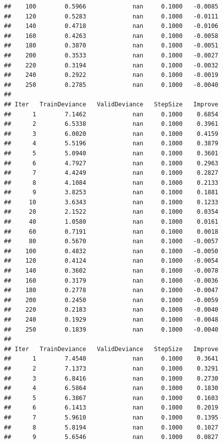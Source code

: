 \documentclass[
]{book}
\begin{document}
\begin{verbatim}
##    100        0.5966             nan     0.1000   -0.0085
##    120        0.5283             nan     0.1000   -0.0111
##    140        0.4718             nan     0.1000   -0.0106
##    160        0.4263             nan     0.1000   -0.0058
##    180        0.3870             nan     0.1000   -0.0051
##    200        0.3533             nan     0.1000   -0.0027
##    220        0.3194             nan     0.1000   -0.0032
##    240        0.2922             nan     0.1000   -0.0019
##    250        0.2785             nan     0.1000   -0.0040
## 
## Iter   TrainDeviance   ValidDeviance   StepSize   Improve
##      1        7.1462             nan     0.1000    0.6854
##      2        6.5338             nan     0.1000    0.3961
##      3        6.0020             nan     0.1000    0.4159
##      4        5.5196             nan     0.1000    0.3879
##      5        5.0940             nan     0.1000    0.3601
##      6        4.7927             nan     0.1000    0.2963
##      7        4.4249             nan     0.1000    0.2827
##      8        4.1084             nan     0.1000    0.2133
##      9        3.8253             nan     0.1000    0.1881
##     10        3.6343             nan     0.1000    0.1233
##     20        2.1522             nan     0.1000    0.0354
##     40        1.0580             nan     0.1000    0.0161
##     60        0.7191             nan     0.1000    0.0018
##     80        0.5670             nan     0.1000   -0.0057
##    100        0.4832             nan     0.1000   -0.0050
##    120        0.4124             nan     0.1000   -0.0054
##    140        0.3602             nan     0.1000   -0.0078
##    160        0.3179             nan     0.1000   -0.0036
##    180        0.2778             nan     0.1000   -0.0047
##    200        0.2450             nan     0.1000   -0.0059
##    220        0.2183             nan     0.1000   -0.0040
##    240        0.1929             nan     0.1000   -0.0048
##    250        0.1839             nan     0.1000   -0.0040
## 
## Iter   TrainDeviance   ValidDeviance   StepSize   Improve
##      1        7.4540             nan     0.1000    0.3641
##      2        7.1373             nan     0.1000    0.3291
##      3        6.8416             nan     0.1000    0.2730
##      4        6.5864             nan     0.1000    0.1830
##      5        6.3867             nan     0.1000    0.1603
##      6        6.1413             nan     0.1000    0.2019
##      7        5.9610             nan     0.1000    0.1395
##      8        5.8194             nan     0.1000    0.1027
##      9        5.6546             nan     0.1000    0.0827

\end{verbatim}
\end{document}
